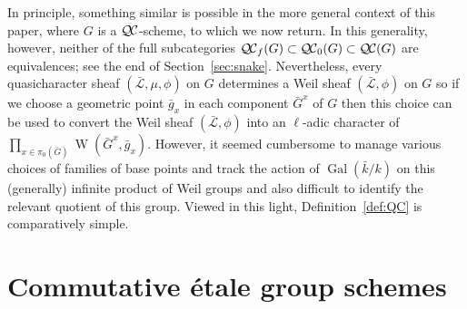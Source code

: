 \documentclass{amsart}
\theoremstyle{plain}
\theoremstyle{definition}
\theoremstyle{remark}
\newcommand{\bFq}{\bar{k}}
\newcommand{\Fq}{k}
\DeclareMathOperator{\Gal}{Gal}
\DeclareMathOperator{\W}{W}
\newcommand{\gqcs}[1]{{\mathcal{\bar #1}}}
\newcommand{\QC}{{\mathcal{Q\hskip-0.8pt C}}}
\newcommand{\QCb}{{\QC_0}}
\newcommand{\QCf}{{\QC_f}}
\newcommand{\bG}{\bar{G}}
\begin{document}
In principle, something similar is possible in the more general 
context of this paper, where $G$ is a $\QC$-scheme, to which we now return. 
In this generality, however, neither of the full subcategories $\QCf(G) \subset \QCb(G) \subset \QC(G)$ are equivalences;
see the end of Section~\ref{sec:snake}.
Nevertheless, every quasicharacter sheaf $(\gqcs{L},\mu,\phi)$ on $G$ 
determines a Weil sheaf $(\gqcs{L},\phi)$ on $G$
so if we choose a geometric point ${\bar g}_x$ in each component $\bG^x$ of $G$ 
then this choice can be used to convert 
the Weil sheaf $(\gqcs{L},\phi)$ into an $\ell$-adic character of $\prod_{x\in \pi_0(\bG)}\W(\bG^x, {\bar g}_x)$. 
However, it seemed cumbersome to manage various 
choices of families of base points and track the action 
of $\Gal(\bFq/\Fq)$ on this (generally) infinite product of 
Weil groups and also difficult to identify the relevant quotient of this group.
Viewed in this light, Definition~\ref{def:QC} is comparatively simple.

\section{Commutative \'etale group schemes} \label{sec:etale}
\end{document}
